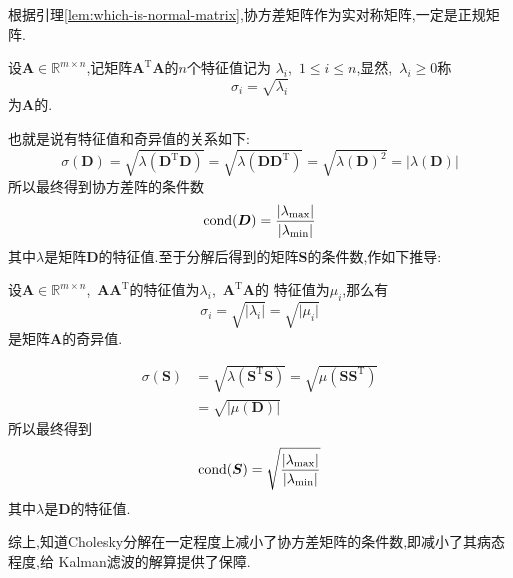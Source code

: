 \documentclass[cn,10pt,citestyle=gb7714-2015,bibstyle=gb7714-2015]{elegantbook}
\newcommand{\mT}{\mathrm{T}}
\begin{document}
根据引理\ref{lem:which-is-normal-matrix},协方差矩阵作为实对称矩阵,一定是正规矩阵.
\begin{definition}[奇异值]\label{def:singular-value}
  设$\bm{A}\in\mathbb{R}^{m\times n}$,记矩阵$\bm{A}^\mT\bm{A}$的$n$个特征值记为
  $\lambda_i$,\ $1\leqslant i\leqslant n$,显然,\ $\lambda_i\geqslant 0$称
  \[
    \sigma_i=\sqrt{\lambda_i}
  \]
  为$\bm{A}$的.
\end{definition}
也就是说有特征值和奇异值的关系如下:
\[
  \sigma(\bm{D})=\sqrt{\lambda(\bm{D}^\mT\bm{D})}=\sqrt{\lambda(\bm{D}\bm{D}^\mT)}=\sqrt{\lambda(\bm{D})^2}=\vert\lambda(\bm{D})\vert
\]
所以最终得到协方差阵的条件数
\begin{equation}
  \textup{cond}(\bm{D})=\frac{\vert\lambda_{\max}\vert}{\vert\lambda_{\min}\vert}
\end{equation}
其中$\lambda$是矩阵$\bm{D}$的特征值.至于分解后得到的矩阵$\bm{S}$的条件数,作如下推导:
\begin{lemma}[Cholesky分解得到矩阵的奇异值]
  设$\bm{A}\in\mathbb{R}^{m\times n}$,\ $\bm{A}\bm{A}^\mT$的特征值为$\lambda_i$,\ $\bm{A}^\mT\bm{A}$的
  特征值为$\mu_i$,那么有
  \begin{equation}
    \sigma_i=\sqrt{\vert\lambda_i\vert}=\sqrt{\vert\mu_i\vert}
  \end{equation}
  是矩阵$\bm{A}$的奇异值.
\end{lemma}
\begin{align*}
  \sigma(\bm{S})&=\sqrt{\lambda(\bm{S}^\mT\bm{S})}=\sqrt{\mu(\bm{S}\bm{S}^\mT)}\\
  &=\sqrt{\vert\mu(\bm{D})\vert}
\end{align*}
所以最终得到
\begin{equation}
  \textup{cond}(\bm{S})=\sqrt{\frac{\vert\lambda_{\max}\vert}{\vert\lambda_{\min}\vert}}
\end{equation}
其中$\lambda$是$\bm{D}$的特征值.

综上,知道Cholesky分解在一定程度上减小了协方差矩阵的条件数,即减小了其病态程度,给
Kalman滤波的解算提供了保障.
\end{document}
